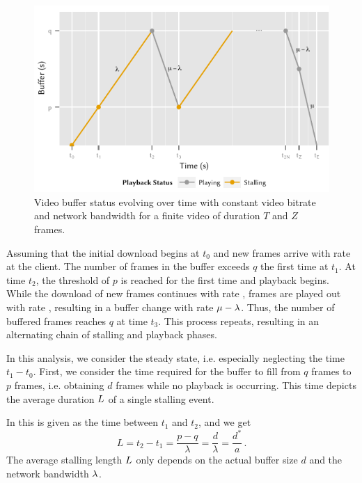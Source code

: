 \begin{figure}
  \centering
  \includegraphics{application/qoe_user_behaviour/system_model/figures/player}
  \caption{Video buffer status evolving over time with constant video bitrate and network bandwidth for a finite video of duration \(T\) and \(Z\) frames.}
  \label{fig:application:qoe_user_behaviour:system_model:steady_state:player}
\end{figure}

Assuming that the initial download begins at \(t_0\) and new frames arrive with rate \networkBandwidth at the client.
The number of frames in the buffer exceeds \(q\) the first time at \(t_1\).
At time \(t_2\), the threshold of \(p\) is reached for the first time and playback begins.
While the download of new frames continues with rate \networkBandwidth, frames are played out with rate \playbackRate, resulting in a buffer change with rate \(\mu - \lambda\).
Thus, the number of buffered frames reaches \(q\) at time \(t_3\).
This process repeats, resulting in an alternating chain of stalling and playback phases.

In this analysis, we consider the steady state, i.e. especially neglecting the time \(t_1 - t_0\).
First, we consider the time required for the buffer to fill from \(q\) frames to \(p\) frames, i.e. obtaining \(d\) frames while no playback is occurring.
This time depicts the average duration \(L\) of a single stalling event.

In  this is given as the time between \(t_1\) and \(t_2\), and we get
\begin{equation}
L=t_2-t_1 = \frac{p-q}{\lambda}=\frac{d}{\lambda} = \frac{d^*}{a}\, .
\label{eq:application:qoe_user_behaviour:system_model:steady_state:mean_stalling_event}
\end{equation}
The average stalling length \(L\) only depends on the actual buffer size \(d\) and the network bandwidth \(\lambda\).

